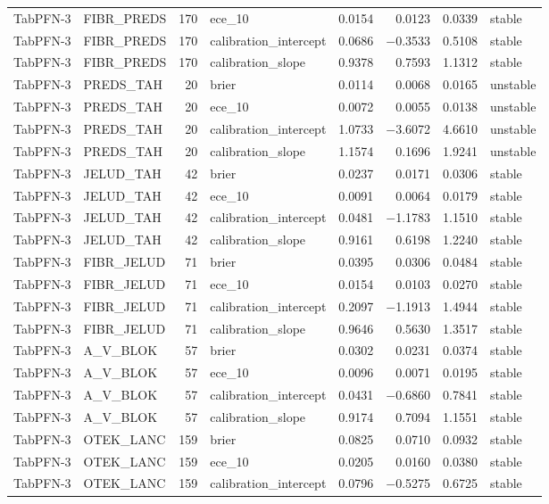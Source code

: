 \begin{longtable}{llrlrrrl}
TabPFN-3 & FIBR\_PREDS & 170 & ece\_10 & 0.0154 & 0.0123 & 0.0339 & stable \\
TabPFN-3 & FIBR\_PREDS & 170 & calibration\_intercept & 0.0686 & $-$0.3533 & 0.5108 & stable \\
TabPFN-3 & FIBR\_PREDS & 170 & calibration\_slope & 0.9378 & 0.7593 & 1.1312 & stable \\
TabPFN-3 & PREDS\_TAH & 20 & brier & 0.0114 & 0.0068 & 0.0165 & unstable \\
TabPFN-3 & PREDS\_TAH & 20 & ece\_10 & 0.0072 & 0.0055 & 0.0138 & unstable \\
TabPFN-3 & PREDS\_TAH & 20 & calibration\_intercept & 1.0733 & $-$3.6072 & 4.6610 & unstable \\
TabPFN-3 & PREDS\_TAH & 20 & calibration\_slope & 1.1574 & 0.1696 & 1.9241 & unstable \\
TabPFN-3 & JELUD\_TAH & 42 & brier & 0.0237 & 0.0171 & 0.0306 & stable \\
TabPFN-3 & JELUD\_TAH & 42 & ece\_10 & 0.0091 & 0.0064 & 0.0179 & stable \\
TabPFN-3 & JELUD\_TAH & 42 & calibration\_intercept & 0.0481 & $-$1.1783 & 1.1510 & stable \\
TabPFN-3 & JELUD\_TAH & 42 & calibration\_slope & 0.9161 & 0.6198 & 1.2240 & stable \\
TabPFN-3 & FIBR\_JELUD & 71 & brier & 0.0395 & 0.0306 & 0.0484 & stable \\
TabPFN-3 & FIBR\_JELUD & 71 & ece\_10 & 0.0154 & 0.0103 & 0.0270 & stable \\
TabPFN-3 & FIBR\_JELUD & 71 & calibration\_intercept & 0.2097 & $-$1.1913 & 1.4944 & stable \\
TabPFN-3 & FIBR\_JELUD & 71 & calibration\_slope & 0.9646 & 0.5630 & 1.3517 & stable \\
TabPFN-3 & A\_V\_BLOK & 57 & brier & 0.0302 & 0.0231 & 0.0374 & stable \\
TabPFN-3 & A\_V\_BLOK & 57 & ece\_10 & 0.0096 & 0.0071 & 0.0195 & stable \\
TabPFN-3 & A\_V\_BLOK & 57 & calibration\_intercept & 0.0431 & $-$0.6860 & 0.7841 & stable \\
TabPFN-3 & A\_V\_BLOK & 57 & calibration\_slope & 0.9174 & 0.7094 & 1.1551 & stable \\
TabPFN-3 & OTEK\_LANC & 159 & brier & 0.0825 & 0.0710 & 0.0932 & stable \\
TabPFN-3 & OTEK\_LANC & 159 & ece\_10 & 0.0205 & 0.0160 & 0.0380 & stable \\
TabPFN-3 & OTEK\_LANC & 159 & calibration\_intercept & 0.0796 & $-$0.5275 & 0.6725 & stable \\

\end{longtable}
